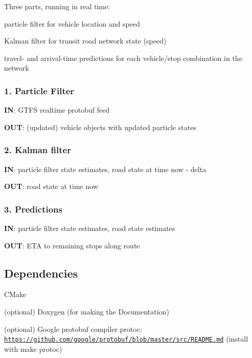 Three parts, running in real time\+:
\begin{DoxyEnumerate}
\item particle filter for vehicle location and speed
\item Kalman filter for transit road network state (speed)
\item travel-\/ and arrival-\/time predictions for each vehicle/stop combination in the network
\end{DoxyEnumerate}

\subsubsection*{1. Particle Filter}

{\bfseries IN}\+: G\+T\+FS realtime protobuf feed

{\bfseries O\+UT}\+: (updated) vehicle objects with updated particle states

\subsubsection*{2. Kalman filter}

{\bfseries IN}\+: particle filter state estimates, road state at time {\ttfamily now -\/ delta}

{\bfseries O\+UT}\+: road state at time {\ttfamily now}

\subsubsection*{3. Predictions}

{\bfseries IN}\+: particle filter state estimates, road state estimates

{\bfseries O\+UT}\+: E\+TA to remaining stops along route



 \subsection*{Dependencies}


\begin{DoxyItemize}
\item C\+Make
\item (optional) Doxygen (for making the Documentation)
\item (optional) Google protobuf compiler {\ttfamily protoc}\+: \href{https://github.com/google/protobuf/blob/master/src/README.md}{\tt https\+://github.\+com/google/protobuf/blob/master/src/\+R\+E\+A\+D\+M\+E.\+md} (install with {\ttfamily make protoc})
\end{DoxyItemize}

